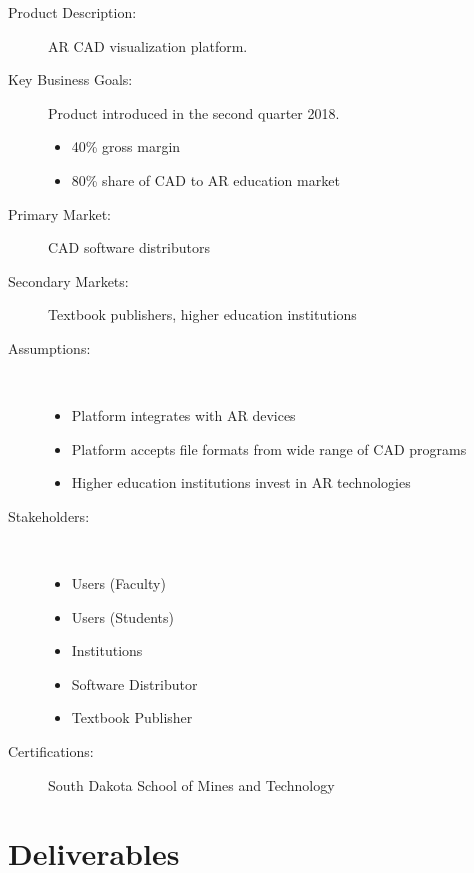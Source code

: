 \begin{description}
	\item [Product Description:] AR CAD visualization platform.
	
	\item [Key Business Goals:] Product introduced in the second quarter 2018.
	\begin{itemize}
		\item 40\% gross margin
		\item 80\% share of CAD to AR education market
	\end{itemize}
	
	\item [Primary Market:] CAD software distributors
	\item [Secondary Markets:] Textbook publishers, higher education institutions
	
	\item [Assumptions:]  ~~ \\
	\begin{itemize}
		\item Platform integrates with AR devices 
		\item Platform accepts file formats from wide range of CAD programs
		\item Higher education institutions invest in AR technologies
	\end{itemize}
	
	\item [Stakeholders:]  ~~ \\
	\begin{itemize}
		\item Users (Faculty)
		\item Users (Students)
		\item Institutions
		\item Software Distributor
		\item Textbook Publisher
	\end{itemize}
	
	\item [Certifications:] South Dakota School of Mines and Technology
\end{description}

\section{Deliverables}

 

